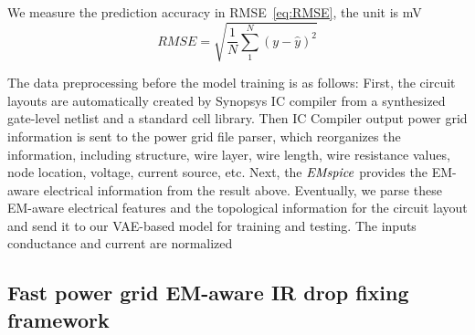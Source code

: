We measure the prediction accuracy in RMSE~\eqref{eq:RMSE}, the unit is mV
\begin{equation}
	\label{eq:RMSE}
	\textit{RMSE} =\sqrt{ \frac{1}{N} \sum_{1}^{N} ( y - \hat{y})^{2} }
\end{equation}






The data preprocessing before the model training is as follows:
First, the circuit layouts are automatically created by Synopsys IC compiler from a synthesized gate-level netlist and a standard cell library. 
Then IC Compiler output power grid information is sent to the power grid file parser, which reorganizes the information, including structure, wire layer, wire length, wire resistance values, node location, voltage, current source, etc.
Next, the $\it{EMspice}$ provides the EM-aware electrical information from the result above.
Eventually, we parse these EM-aware electrical features and the topological information for the circuit layout and send it to our VAE-based model for training and testing.  The inputs conductance and current are normalized

\begin{table}[!htbp]
	\begin{center}
		\caption{Power Grid Designs Detail}
		\label{table:pg_detail}
		\center
	\end{center}
	\vspace{-0.1in}
\end{table}




\subsection{Fast power grid EM-aware IR drop fixing framework }
\label{subsec:formulation}

